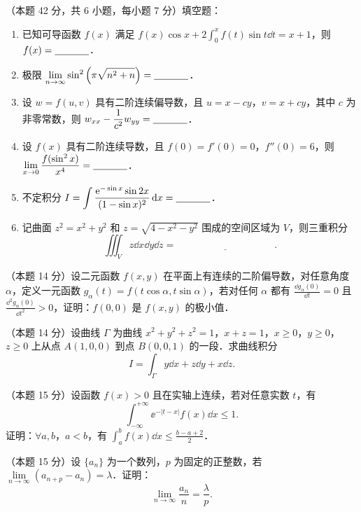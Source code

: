 
\begin{problems}
\item[一、]（本题 42 分，共 6 小题，每小题 7 分）填空题：
\begin{enumerate}
  \item 已知可导函数 $f(x)$ 满足 $\displaystyle f(x)\cos x+2\int_0^x f(t)\sin t\dd t=x+1$，则 $f(x)=\underline{\hspace{3.5em}}$．
  \item 极限 $\displaystyle \lim_{n\to\infty}\sin^2\left(\pi\sqrt{n^2+n}\right)=\underline{\hspace{3.5em}}$．
  \item 设 $w=f(u,v)$ 具有二阶连续偏导数，且 $u=x-cy$，$v=x+cy$，其中 $c$ 为非零常数，则 $\displaystyle w_{xx}-\frac{1}{c^2}w_{yy}=\underline{\hspace{3.5em}}$．
  \item 设 $f(x)$ 具有二阶连续导数，且 $f(0)=f'(0)=0$，$f''(0)=6$，则 $\displaystyle \lim_{x\to 0}\frac{f(\sin^2 x)}{x^4}=\underline{\hspace{3.5em}}$．
  \item 不定积分 $\displaystyle I=\int\frac{\mathrm{e}^{-\sin x}\sin 2x}{(1-\sin x)^2}\,\mathrm{d} x=\underline{\hspace{3.5em}}$．
  \item 记曲面 $z^2=x^2+y^2$ 和 $z=\sqrt{4-x^2-y^2}$ 围成的空间区域为 $V$，则三重积分
  \[
    \iiint_V z\dd x\dd y\dd z=\underline{\hspace{10em}}.
  \]
\end{enumerate}

\item[二、]（本题 14 分）设二元函数 $f(x,y)$ 在平面上有连续的二阶偏导数，对任意角度 $\alpha$，定义一元函数 $g_\alpha(t)=f(t\cos\alpha,t\sin\alpha)$，若对任何 $\alpha$ 都有 $\displaystyle \frac{\dd g_\alpha(0)}{\dd t}=0$ 且 $\displaystyle \frac{\dd^2 g_\alpha(0)}{\dd t^2}>0$，证明：$f(0,0)$ 是 $f(x,y)$ 的极小值．

\item[三、]（本题 14 分）设曲线 $\Gamma$ 为曲线 $x^2+y^2+z^2=1$，$x+z=1$，$x\ge 0$，$y\ge 0$，$z\ge 0$ 上从点 $A(1,0,0)$ 到点 $B(0,0,1)$ 的一段．求曲线积分
\[
  I=\int_\Gamma y\dd x+z\dd y+x\dd z.
\]

\item[四、]（本题 15 分）设函数 $f(x)>0$ 且在实轴上连续，若对任意实数 $t$，有
\[
  \int_{-\infty}^{+\infty}\ee^{-|t-x|}f(x)\dd x\le 1.
\]
证明：$\forall a,b$，$a<b$，有 $\displaystyle \int_a^b f(x)\dd x\le\frac{b-a+2}{2}$．

\item[五、]（本题 15 分）设 $\{a_n\}$ 为一个数列，$p$ 为固定的正整数，若 $\lim\limits_{n\to\infty}(a_{n+p}-a_n)=\lambda$．证明：
\[
  \lim_{n\to\infty}\frac{a_n}{n}=\frac{\lambda}{p}.
\]
\end{problems}
